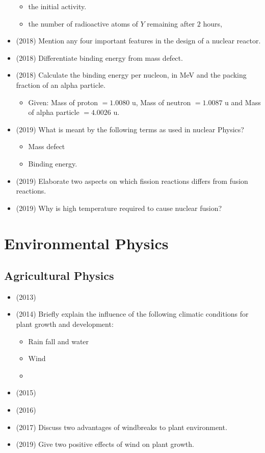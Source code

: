 \documentclass{article}
\begin{document}
\begin{itemize}
\begin{itemize}
\item the initial activity. 
\item the number of radioactive atoms of $ Y$ remaining after $ 2$ hours, 
\end{itemize}
\item (2018)  Mention any four important features in the design of a nuclear reactor.
\item (2018)  Differentiate binding energy from mass defect.
\item (2018)  Calculate the binding energy per nucleon, in MeV and the packing fraction of an alpha particle.\begin{itemize}
\item Given: Mass of proton $ =1.0080$ u, Mass of neutron $ =1.0087$ u and Mass of alpha particle $ =4.0026$ u.
\end{itemize}
\item (2019)  What is meant by the following terms as used in nuclear Physics?\begin{itemize}
\item Mass defect 
\item Binding energy. 
\end{itemize}
\item (2019)  Elaborate two aspects on which fission reactions differs from fusion reactions.
\item (2019)  Why is high temperature required to cause nuclear fusion? 
\end{itemize}


\section{Environmental Physics}

\subsection{Agricultural Physics}
\begin{itemize}
\item (2013)  \item (2014)  Briefly explain the influence of the following climatic conditions for plant growth and development:\begin{itemize}
\item Rain fall and water
\item Wind
\item 
\end{itemize}
\item (2015)  \item (2016)  \item (2017)  Discuss two advantages of windbreaks to plant environment. 
\item (2019)  Give two positive effects of wind on plant growth.
\end{itemize}
\end{document}
